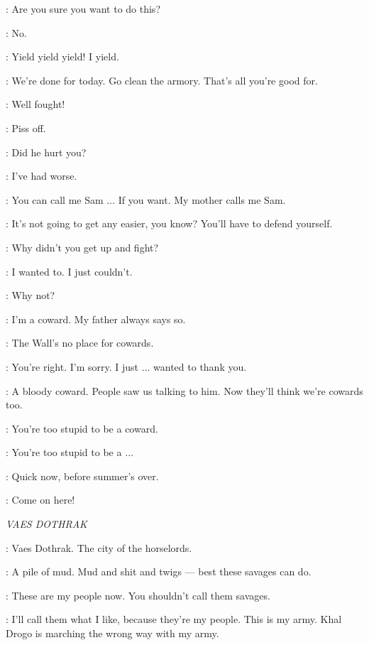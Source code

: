 \JON: Are you sure you want to do this? 

\GRENN: No.


\GRENN: Yield yield yield! I yield. 

\ALLISER: We're done for today. Go clean the armory. That's all you're good for. 

\PYP: Well fought! 

\GRENN: Piss off. 

\SAM:  Did he hurt you? 

\JON: I've had worse. 

\SAM: You can call me Sam $\ldots$ If you want. My mother calls me Sam. 

\JON: It's not going to get any easier, you know? You'll have to defend yourself. 

\GRENN: Why didn't you get up and fight? 

\SAM: I wanted to. I just couldn't. 

\GRENN: Why not? 

\SAM: I'm a coward. My father always says so. 

\JON: The Wall's no place for cowards. 

\SAM: You're right. I'm sorry. I just $\ldots$ wanted to thank you. 

\GRENN: A bloody coward. People saw us talking to him. Now they'll think we're cowards too. 

\PYP: You're too stupid to be a coward. 

\GRENN: You're too stupid to be a $\ldots$ 

\PYP: Quick now, before summer's over. 

\GRENN: Come on here! 


\scene

\textit{VAES DOTHRAK}


\JORAH: Vaes Dothrak. The city of the horselords. 

\VISERYS: A pile of mud. Mud and shit and twigs --- best these savages can do. 

\DAENERYS: These are my people now. You shouldn't call them savages. 

\VISERYS: I'll call them what I like, because they're my people. This is my army. Khal Drogo is marching the wrong way with my army. 

